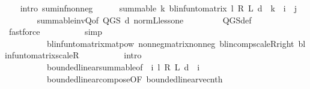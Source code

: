 \begin{isabellebody}
\ \ \isamarkupfalse%
\ {\isacharparenleft}{\kern0pt}intro\ suminf{\isacharunderscore}{\kern0pt}nonneg{\isacharparenright}{\kern0pt}\isanewline
\ \ \ \ \isamarkupfalse%
\ {\isachardoublequoteopen}summable\ {\isacharparenleft}{\kern0pt}{\isasymlambda}k{\isachardot}{\kern0pt}\ blinfun{\isacharunderscore}{\kern0pt}to{\isacharunderscore}{\kern0pt}matrix\ {\isacharparenleft}{\kern0pt}{\isacharparenleft}{\kern0pt}l\ {\isacharasterisk}{\kern0pt}\isactrlsub R\ {\isasymP}\isactrlsub L\ d{\isacharparenright}{\kern0pt}\ {\isacharcircum}{\kern0pt}{\isacharcircum}{\kern0pt}\ k{\isacharparenright}{\kern0pt}\ {\isachardollar}{\kern0pt}\ i\ {\isachardollar}{\kern0pt}\ j{\isacharparenright}{\kern0pt}{\isachardoublequoteclose}\isanewline
\ \ \ \ \ \ \isamarkupfalse%
\ summable{\isacharunderscore}{\kern0pt}inv{\isacharunderscore}{\kern0pt}Q{\isacharbrackleft}{\kern0pt}of\ {\isachardoublequoteopen}Q{\isacharunderscore}{\kern0pt}GS\ d{\isachardoublequoteclose}{\isacharbrackright}{\kern0pt}\ norm{\isacharunderscore}{\kern0pt}{\isasymP}\isactrlsub L{\isacharunderscore}{\kern0pt}less{\isacharunderscore}{\kern0pt}one\ \isanewline
\ \ \ \ \ \ \isamarkupfalse%
\ Q{\isacharunderscore}{\kern0pt}GS{\isacharunderscore}{\kern0pt}def\ \isanewline
\ \ \ \ \ \ \isamarkupfalse%
\ {\isacharparenleft}{\kern0pt}fastforce\isanewline
\ \ \ \ \ \ \ \ \ \ simp{\isacharcolon}{\kern0pt}\ \isanewline
\ \ \ \ \ \ \ \ \ \ blinfun{\isacharunderscore}{\kern0pt}to{\isacharunderscore}{\kern0pt}matrix{\isacharunderscore}{\kern0pt}matpow\ nonneg{\isacharunderscore}{\kern0pt}matrix{\isacharunderscore}{\kern0pt}nonneg\ blincomp{\isacharunderscore}{\kern0pt}scaleR{\isacharunderscore}{\kern0pt}right\ blinfun{\isacharunderscore}{\kern0pt}to{\isacharunderscore}{\kern0pt}matrix{\isacharunderscore}{\kern0pt}scaleR\isanewline
\ \ \ \ \ \ \ \ \ \ intro{\isacharcolon}{\kern0pt}\isanewline
\ \ \ \ \ \ \ \ \ \ bounded{\isacharunderscore}{\kern0pt}linear{\isachardot}{\kern0pt}summable{\isacharbrackleft}{\kern0pt}of\ {\isacharunderscore}{\kern0pt}\ {\isachardoublequoteopen}{\isasymlambda}i{\isachardot}{\kern0pt}\ {\isacharparenleft}{\kern0pt}l\ {\isacharasterisk}{\kern0pt}\isactrlsub R\ {\isasymP}\isactrlsub L\ d{\isacharparenright}{\kern0pt}\ {\isacharcircum}{\kern0pt}{\isacharcircum}{\kern0pt}\ i{\isachardoublequoteclose}{\isacharbrackright}{\kern0pt}\ \isanewline
\ \ \ \ \ \ \ \ \ \ bounded{\isacharunderscore}{\kern0pt}linear{\isacharunderscore}{\kern0pt}compose{\isacharbrackleft}{\kern0pt}OF\ bounded{\isacharunderscore}{\kern0pt}linear{\isacharunderscore}{\kern0pt}vec{\isacharunderscore}{\kern0pt}nth{\isacharbrackright}{\kern0pt}\ \isanewline

\end{isabellebody}
